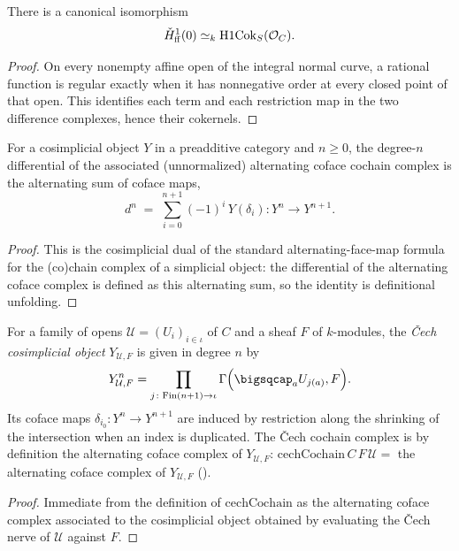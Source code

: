 \begin{proposition}
  \label{thm:adelic_function_field_H1_zero_compare}
  There is a canonical isomorphism
  \[
    \check H^1_{\mathrm{ff}}(0)
      \simeq_k\operatorname{H1Cok}_S(\mathcal{O}_{C}).
  \]
\end{proposition}
\begin{proof}
  On every nonempty affine open of the integral normal curve, a rational
  function is regular exactly when it has nonnegative order at every
  closed point of that open.  This identifies each term and each
  restriction map in the two difference complexes, hence their cokernels.
\end{proof}

\begin{lemma}
  \label{lem:adelic_alternatingCofaceMapComplex_objD}
  \leanok
  For a cosimplicial object \(Y\) in a preadditive category and \(n \ge
  0\), the degree-\(n\) differential of the associated (unnormalized)
  alternating coface cochain complex is the alternating sum of coface
  maps,
  \[
    d^n \;=\; \sum_{i = 0}^{n+1} (-1)^i\, Y(\delta_i) \colon Y^n \to
    Y^{n+1}.
  \]
\end{lemma}
\begin{proof}
  \leanok
  This is the cosimplicial dual of the standard alternating-face-map
  formula for the (co)chain complex of a simplicial object: the
  differential of the alternating coface complex is defined as this
  alternating sum, so the identity is definitional unfolding.
\end{proof}

\begin{definition}
  \label{def:adelic_cechCosimplicial}
  \leanok
  For a family of opens \(\mathcal{U} = (U_i)_{i \in \iota}\) of \(C\)
  and a sheaf \(F\) of \(k\)-modules, the \emph{Čech cosimplicial object}
  \(Y_{\mathcal{U}, F}\) is given in degree \(n\) by
  \[
    Y_{\mathcal U,F}^n=
      \prod_{j \colon \mathrm{Fin}(n+1) \to \iota}
        \Gamma\Bigl(\bigsqcap_a U_{j(a)},F\Bigr).
  \]
  Its coface maps \(\delta_{i_0} \colon Y^n \to Y^{n+1}\) are induced by
  restriction along the shrinking of the
  intersection when an index is duplicated. The Čech cochain complex is
  by definition the alternating coface complex of \(Y_{\mathcal{U},
  F}\):
  \(\mathrm{cechCochain}\, C\, F\, \mathcal{U} =\) the alternating coface
  complex of \(Y_{\mathcal{U}, F}\)
  ().
\end{definition}
\begin{proof}
  \leanok
  Immediate from the definition of \(\mathrm{cechCochain}\) as the
  alternating coface complex associated to the cosimplicial object
  obtained by evaluating the Čech nerve of \(\mathcal{U}\) against \(F\).
\end{proof}

